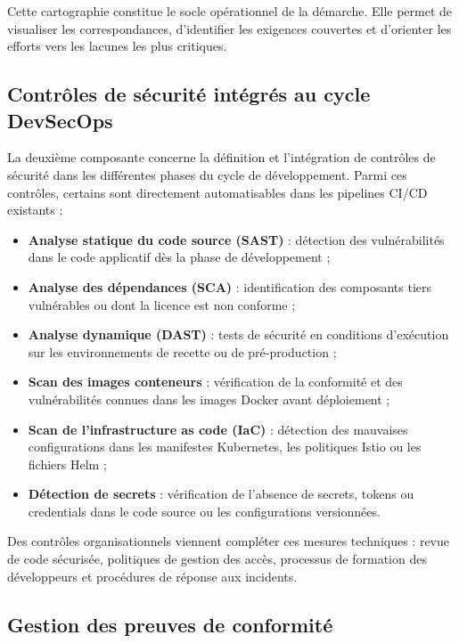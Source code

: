 Cette cartographie constitue le socle opérationnel de la démarche. Elle permet de visualiser les correspondances, d'identifier les exigences couvertes et d'orienter les efforts vers les lacunes les plus critiques.

\subsection{Contrôles de sécurité intégrés au cycle DevSecOps}

La deuxième composante concerne la définition et l'intégration de contrôles de sécurité dans les différentes phases du cycle de développement. Parmi ces contrôles, certains sont directement automatisables dans les pipelines CI/CD existants :

\begin{itemize}
    \item \textbf{Analyse statique du code source (SAST)} : détection des vulnérabilités dans le code applicatif dès la phase de développement ;
    \item \textbf{Analyse des dépendances (SCA)} : identification des composants tiers vulnérables ou dont la licence est non conforme ;
    \item \textbf{Analyse dynamique (DAST)} : tests de sécurité en conditions d'exécution sur les environnements de recette ou de pré-production ;
    \item \textbf{Scan des images conteneurs} : vérification de la conformité et des vulnérabilités connues dans les images Docker avant déploiement ;
    \item \textbf{Scan de l'infrastructure as code (IaC)} : détection des mauvaises configurations dans les manifestes Kubernetes, les politiques Istio ou les fichiers Helm ;
    \item \textbf{Détection de secrets} : vérification de l'absence de secrets, tokens ou credentials dans le code source ou les configurations versionnées.
\end{itemize}

Des contrôles organisationnels viennent compléter ces mesures techniques : revue de code sécurisée, politiques de gestion des accès, processus de formation des développeurs et procédures de réponse aux incidents.

\subsection{Gestion des preuves de conformité}

